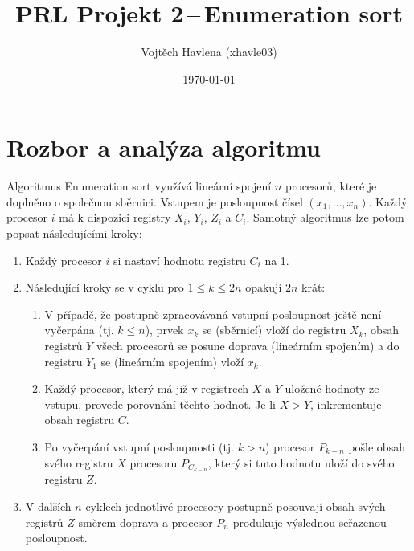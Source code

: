 \documentclass[a4paper,12pt]{article}
\title{\bf PRL Projekt 2\,--\,Enumeration sort}
\author{Vojtěch Havlena (xhavle03)}
\date{\today}
\begin{document}
\maketitle


\section{Rozbor a analýza algoritmu}
Algoritmus Enumeration sort využívá lineární spojení $n$ procesorů, které je doplněno o společnou 
sběrnici. Vstupem je posloupnost čísel $(x_1, \dots, x_n)$. Každý procesor $i$ má k dispozici registry 
$X_i$, $Y_i$, $Z_i$ a $C_i$. Samotný algoritmus lze potom popsat následujícími kroky:
\begin{enumerate}[noitemsep]
 \item Každý procesor $i$ si nastaví hodnotu registru $C_i$ na 1.
 \item Následující kroky se v cyklu pro $1\leq k \leq 2n$ opakují $2n$ krát:
 \begin{enumerate}[noitemsep,label=(\alph*)]
  \item V případě, že postupně zpracovávaná vstupní posloupnost ještě není vyčerpána (tj. $k \leq n$), 
  prvek $x_k$ se (sběrnicí) vloží do registru $X_k$, obsah registrů $Y$ všech procesorů se posune 
  doprava (lineárním spojením) a do registru $Y_1$ se (lineárním spojením) vloží $x_k$. 
  \item Každý procesor, který má již v registrech $X$ a $Y$ uložené hodnoty ze vstupu, provede 
  porovnání těchto hodnot. Je-li $X > Y$, inkrementuje obsah registru $C$.
  \item Po vyčerpání vstupní posloupnosti (tj. $k > n$) procesor $P_{k-n}$ pošle obsah svého registru 
  $X$ procesoru $P_{C_{k-n}}$, který si tuto hodnotu uloží do svého registru $Z$.
 \end{enumerate}
 \item V dalších $n$ cyklech jednotlivé procesory postupně posouvají obsah svých registrů $Z$ směrem 
 doprava a procesor $P_n$ produkuje výslednou seřazenou posloupnost.
\end{enumerate}
\end{document}
